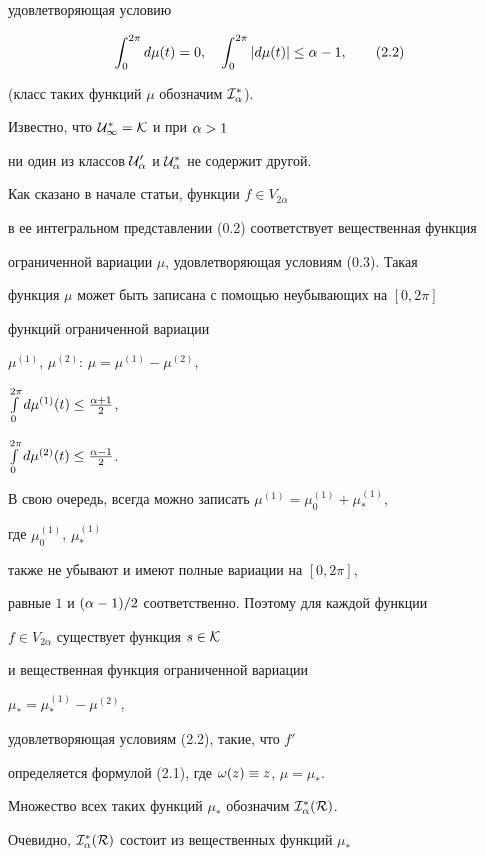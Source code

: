 удовлетворяющая условию


\begin{equation}


\int_0^{2\pi}d\mu(t)=0, \quad \int_0^{2\pi}|d\mu(t)|\le \al-1,


\tag{2.2}


\end{equation}


(класс таких функций $\mu$ обозначим $\cal I_\alpha^*$).


Известно, что $\cal U_1^*=\cal K$ и при $\alpha>1$


ни один из классов $\cal U_\alpha'$ и $\cal U_\alpha^*$ не содержит другой.





Как сказано в начале статьи, функции $f\in V_{2\alpha}$


в ее интегральном представлении (0.2) соответствует вещественная функция


ограниченной вариации $\mu$, удовлетворяющая условиям (0.3). Такая


функция $\mu$ может быть записана с помощью неубывающих на $[0,2\pi]$


функций ограниченной вариации


$\mu^{(1)}$, $\mu^{(2)}$: $\mu=\mu^{(1)}-\mu^{(2)}$,


$\int\limits_0^{2\pi}d\mu^{(1)}(t)\le\frac{\alpha+1}{2}$,


$\int\limits_0^{2\pi}d\mu^{(2)}(t)\le\frac{\alpha-1}{2}$.


В свою очередь, всегда можно записать $\mu^{(1)}=\mu^{(1)}_0+\mu^{(1)}_*$,


где $\mu^{(1)}_0$, $\mu^{(1)}_*$


также не убывают и имеют полные вариации на $[0,2\pi]$,


равные $1$ и $(\alpha-1)/2$ соответственно. Поэтому для каждой функции


$f\in V_{2\alpha}$ существует функция $s\in\cal K$


и вещественная функция ограниченной вариации


$\mu_*=\mu^{(1)}_*-\mu^{(2)}$,


удовлетворяющая условиям (2.2), такие, что $f'$


определяется формулой (2.1), где $\omega(z)\equiv z$, $\mu=\mu_*$.


Множество всех таких функций $\mu_*$ обозначим $\cal I_\alpha^*(R)$.


Очевидно, $\cal I_\alpha^*(R)$ состоит из вещественных функций $\mu_*$


